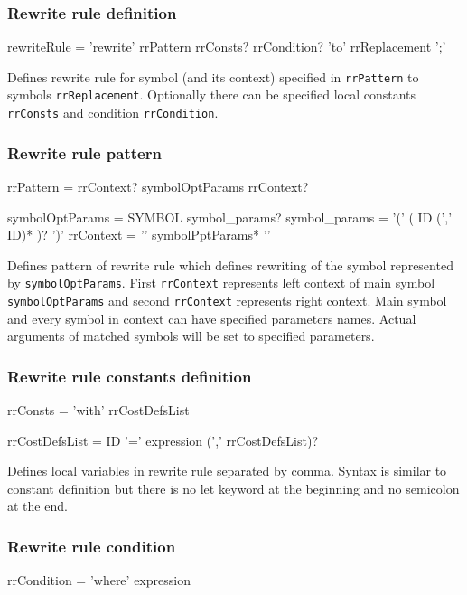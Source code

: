 \subsubsection{Rewrite rule definition}
\begin{Grammar}
rewriteRule = 'rewrite' rrPattern rrConsts? rrCondition?
	'to' rrReplacement ';'
\end{Grammar}

Defines rewrite rule for symbol (and its context) specified in \texttt{rrPattern} to symbols \texttt{rrReplacement}.
Optionally there can be specified local constants \texttt{rrConsts} and condition \texttt{rrCondition}.


\subsubsection{Rewrite rule pattern}
\begin{Grammar}
rrPattern = rrContext? symbolOptParams rrContext?

symbolOptParams = SYMBOL symbol_params?
symbol_params = '(' ( ID (',' ID)* )? ')'
rrContext = '{' symbolPptParams* '}'
\end{Grammar}

Defines pattern of rewrite rule which defines rewriting of the symbol represented by \texttt{symbolOptParams}.
First \texttt{rrContext} represents left context of main symbol \texttt{symbolOptParams} and second \texttt{rrContext} represents right context.
Main symbol and every symbol in context can have specified parameters names.
Actual arguments of matched symbols will be set to specified parameters.


\subsubsection{Rewrite rule constants definition}
\begin{Grammar}
rrConsts = 'with' rrCostDefsList

rrCostDefsList = ID '=' expression  (',' rrCostDefsList)?
\end{Grammar}

Defines local variables in rewrite rule separated by comma.
Syntax is similar to constant definition but there is no let keyword at the beginning and no semicolon at the end.


\subsubsection{Rewrite rule condition}
\begin{Grammar}
rrCondition = 'where' expression
\end{Grammar}

